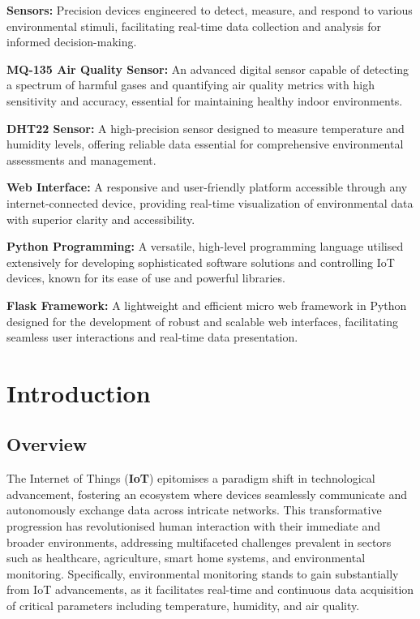 \documentclass[a4paper, 12pt]{report}
\begin{document}
\vspace{0.5cm}

\textbf{Sensors:} Precision devices engineered to detect, measure, and respond to various environmental stimuli, facilitating real-time data collection and analysis for informed decision-making.

\vspace{0.5cm}

\textbf{MQ-135 Air Quality Sensor:} An advanced digital sensor capable of detecting a spectrum of harmful gases and quantifying air quality metrics with high sensitivity and accuracy, essential for maintaining healthy indoor environments.

\vspace{0.5cm}

\textbf{DHT22 Sensor:} A high-precision sensor designed to measure temperature and humidity levels, offering reliable data essential for comprehensive environmental assessments and management.

\vspace{0.5cm}

\textbf{Web Interface:} A responsive and user-friendly platform accessible through any internet-connected device, providing real-time visualization of environmental data with superior clarity and accessibility.

\vspace{0.5cm}

\textbf{Python Programming:} A versatile, high-level programming language utilised extensively for developing sophisticated software solutions and controlling IoT devices, known for its ease of use and powerful libraries.

\vspace{0.5cm}

\textbf{Flask Framework:} A lightweight and efficient micro web framework in Python designed for the development of robust and scalable web interfaces, facilitating seamless user interactions and real-time data presentation.

\newpage

\section{Introduction}
\subsection{Overview}
The Internet of Things (\textbf{IoT}) epitomises a paradigm shift in technological advancement, fostering an ecosystem where devices seamlessly communicate and autonomously exchange data across intricate networks. This transformative progression has revolutionised human interaction with their immediate and broader environments, addressing multifaceted challenges prevalent in sectors such as healthcare, agriculture, smart home systems, and environmental monitoring. Specifically, environmental monitoring stands to gain substantially from IoT advancements, as it facilitates real-time and continuous data acquisition of critical parameters including temperature, humidity, and air quality.
\end{document}
